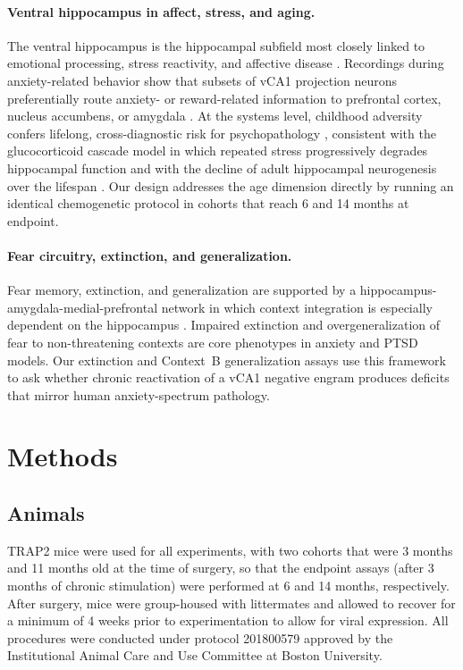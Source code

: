 \documentclass[11pt]{article}
\begin{document}
\paragraph{Ventral hippocampus in affect, stress, and aging.}
The ventral hippocampus is the hippocampal subfield most closely linked to emotional processing, stress reactivity, and affective disease \citep{fanselow2010ventral}. Recordings during anxiety-related behavior show that subsets of vCA1 projection neurons preferentially route anxiety- or reward-related information to prefrontal cortex, nucleus accumbens, or amygdala \citep{ciocchi2015vca1}. At the systems level, childhood adversity confers lifelong, cross-diagnostic risk for psychopathology \citep{kessler2010childhood}, consistent with the glucocorticoid cascade model in which repeated stress progressively degrades hippocampal function \citep{sapolsky1986glucocorticoid} and with the decline of adult hippocampal neurogenesis over the lifespan \citep{klempin2007neurogenesis}. Our design addresses the age dimension directly by running an identical chemogenetic protocol in cohorts that reach 6 and 14 months at endpoint.

\paragraph{Fear circuitry, extinction, and generalization.}
Fear memory, extinction, and generalization are supported by a hippocampus-amygdala-medial-prefrontal network in which context integration is especially dependent on the hippocampus \citep{maren2013contextual,tovote2015circuits}. Impaired extinction and overgeneralization of fear to non-threatening contexts are core phenotypes in anxiety and PTSD models. Our extinction and Context~B generalization assays use this framework to ask whether chronic reactivation of a vCA1 negative engram produces deficits that mirror human anxiety-spectrum pathology.

\section{Methods}

\subsection{Animals}
TRAP2 mice were used for all experiments, with two cohorts that were 3 months and 11 months old at the time of surgery, so that the endpoint assays (after 3 months of chronic stimulation) were performed at 6 and 14 months, respectively. After surgery, mice were group-housed with littermates and allowed to recover for a minimum of 4 weeks prior to experimentation to allow for viral expression. All procedures were conducted under protocol 201800579 approved by the Institutional Animal Care and Use Committee at Boston University.
\end{document}
